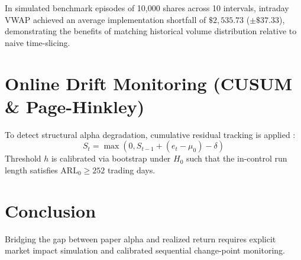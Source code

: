 \documentclass[journal,10pt,twocolumn]{article}
\begin{document}
In simulated benchmark episodes of 10,000 shares across 10 intervals, intraday VWAP achieved an average implementation shortfall of $\$2,535.73$ ($\pm \$37.33$), demonstrating the benefits of matching historical volume distribution relative to naive time-slicing.

\section{Online Drift Monitoring (CUSUM \& Page-Hinkley)}
To detect structural alpha degradation, cumulative residual tracking is applied \cite{page1954continuous}:
\begin{equation}
    S_t = \max(0, S_{t-1} + (e_t - \mu_0) - \delta)
\end{equation}
Threshold $h$ is calibrated via bootstrap under $H_0$ such that the in-control run length satisfies $\text{ARL}_0 \ge 252$ trading days.

\section{Conclusion}
Bridging the gap between paper alpha and realized return requires explicit market impact simulation and calibrated sequential change-point monitoring.



\end{document}

